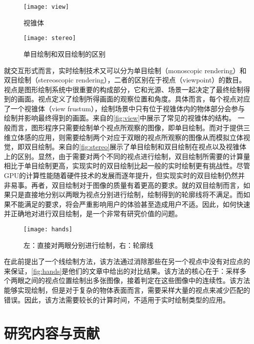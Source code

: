 \begin{figure}[!t]
    \centering
    \texttt{[image: view]}
    \caption{\label{fig:view}
    视锥体}
\end{figure}

\begin{figure}[!b]
    \centering
    \texttt{[image: stereo]}
    \caption{\label{fig:stereo}
    单目绘制和双目绘制的区别}
\end{figure}

就交互形式而言，实时绘制技术又可以分为单目绘制（monoscopic rendering）和双目绘制（stereoscopic rendering），二者的区别在于视点（viewpoint）的数目。视点是图形绘制系统中很重要的构成部分，它和光源、场景一起决定了最终绘制得到的画面。视点定义了绘制所得画面的观察位置和角度。具体而言，每个视点对应了一个视锥体（view frustum），绘制场景中只有位于视锥体内的物体部分会参与绘制并影响最终得到的画面。来自\cite{learnopengl}的\autoref{fig:view}中展示了常见的视锥体的结构。
一般而言，图形程序只需要绘制单个视点所观察的图像，即单目绘制。而对于提供三维立体感的应用，则需要绘制两个对应于双眼的视点所观察的图像从而模拟立体视觉，即双目绘制。来自\cite{topicsinopengl}的\autoref{fig:stereo}展示了单目绘制和双目绘制在视点以及视锥体上的区别。显然，由于需要对两个不同的视点进行绘制，双目绘制所需要的计算量相比于单目绘制更高，实现实时的双目绘制比起一般的实时绘制更有挑战性。尽管GPU的计算性能随着硬件技术的发展而逐年提升，但实现实时的双目绘制仍然并非易事。再者，双目绘制对于图像的质量有着更高的要求。就\con{}的双目绘制而言，如果只是直接地分别以两眼为视点分别进行绘制，绘制得到的轮廓线将不满足\stcy{}。而如果不能满足\stcy{}的要求，将会严重影响用户的体验甚至造成用户不适。因此，如何快速并正确地对\con{}进行双目绘制，是一个非常有研究价值的问题。

\begin{figure}[!t]
    \centering
    \texttt{[image: hands]}
    \caption{\label{fig:hands}
    左：直接对两眼分别进行绘制，右：\stc{}轮廓线}
\end{figure}

\citeauthor{kim2013stereoscopic}在此前提出了一个\stc{}线绘制方法\cite{kim2013stereoscopic}，该方法通过消除那些在另一个视点中没有对应点的\vdp{}来保证\stcy{}，\autoref{fig:hands}是他们的文章中给出的对比结果。该方法的核心在于：采样多个两眼之间的视点位置绘制出多张图像，接着判定\vdp{}在这些图像中的连续性。该方法能够实现\stc{}\vdl{}绘制，但是对于复杂的物体表面而言，需要采样大量的视点来减少匹配的错误。因此，该方法需要较长的计算时间，不适用于实时绘制类型的应用。

\section{研究内容与贡献}

